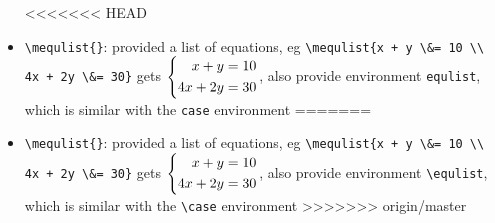 \documentclass{article}
\begin{document}
\begin{itemize}
<<<<<<< HEAD
\item \lstinline`\mequlist{}`: provided a list of equations, eg \lstinline`\mequlist{x + y \&= 10 \\ 4x + 2y \&= 30}` gets ${\left\{ \begin{aligned} x + y &= 10 \\ 4x + 2y &= 30 \end{aligned} \right.}$, also provide environment \lstinline`equlist`, which is similar with the \lstinline`case` environment
=======
\item \lstinline`\mequlist{}`: provided a list of equations, eg \lstinline`\mequlist{x + y \&= 10 \\ 4x + 2y \&= 30}` gets ${\left\{ \begin{aligned} x + y &= 10 \\ 4x + 2y &= 30 \end{aligned} \right.}$, also provide environment \lstinline`\equlist`, which is similar with the \lstinline`\case` environment
>>>>>>> origin/master
\end{itemize}

\end{document}
